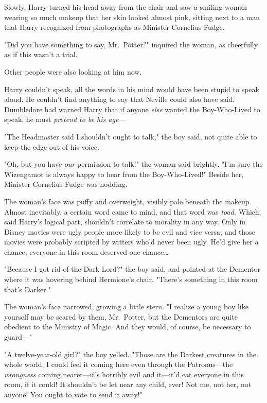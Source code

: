 Slowly, Harry turned his head away from the chair and saw a smiling woman 
wearing so much makeup that her skin looked almost pink, sitting next to a man 
that Harry recognized from photographs as Minister Cornelius Fudge.

"Did you have something to say, Mr.~Potter?" inquired the woman, as cheerfully 
as if this wasn't a trial.

Other people were also looking at him now.

Harry couldn't speak, all the words in his mind would have been stupid to speak 
aloud. He couldn't find anything to say that Neville could also have said. 
Dumbledore had warned Harry that if anyone \emph{else} wanted the Boy-Who-Lived 
to speak, he must \emph{pretend to be his age}---

"The Headmaster said I shouldn't ought to talk," the boy said, not quite able 
to keep the edge out of his voice.

"Oh, but you have \emph{our} permission to talk!" the woman said brightly. "I'm 
sure the Wizengamot is always happy to hear from the Boy-Who-Lived!" Beside 
her, Minister Cornelius Fudge was nodding.

The woman's face was puffy and overweight, visibly pale beneath the makeup. 
Almost inevitably, a certain word came to mind, and that word was \emph{toad.} 
Which, said Harry's logical part, shouldn't correlate to morality in any way. 
Only in Disney movies were ugly people more likely to be evil and vice versa; 
and those movies were probably scripted by writers who'd never been ugly. He'd 
give her a chance, everyone in this room deserved one chance{\ldots}

"Because I got rid of the Dark Lord?" the boy said, and pointed at the Dementor 
where it was hovering behind Hermione's chair. "There's something in this room 
that's Darker."

The woman's face narrowed, growing a little stern. "I realize a young boy like 
yourself may be scared by them, Mr.~Potter, but the Dementors are quite 
obedient to the Ministry of Magic. And they would, of course, be necessary to 
guard---"

"A twelve-year-old girl?" the boy yelled. "Those are the Darkest creatures in 
the whole world, I could feel it coming here even through the Patronus---the 
\emph{wrongness} coming nearer---it's horribly evil and it---it'd eat everyone 
in this room, if it could! It shouldn't be let near any child, ever! Not me, 
not her, not anyone! You ought to vote to send it away!"

